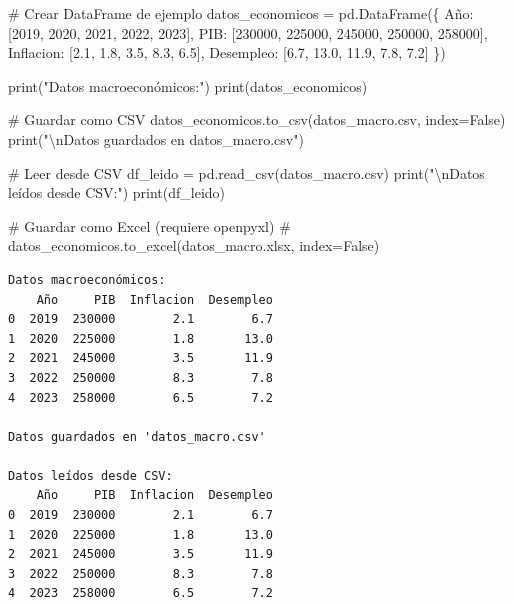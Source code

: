\documentclass[
  doc,
  floatsintext,
  longtable,
  a4paper,
  nolmodern,
  notxfonts,
  notimes,
  12pt,
  colorlinks=true,linkcolor=blue,citecolor=blue,urlcolor=blue]{apa7}
\newenvironment{Shaded}{\begin{snugshade}}{\end{snugshade}}
\newcommand{\BuiltInTok}[1]{\textcolor[rgb]{0.00,0.23,0.31}{#1}}
\newcommand{\CharTok}[1]{\textcolor[rgb]{0.13,0.47,0.30}{#1}}
\newcommand{\CommentTok}[1]{\textcolor[rgb]{0.37,0.37,0.37}{#1}}
\newcommand{\DecValTok}[1]{\textcolor[rgb]{0.68,0.00,0.00}{#1}}
\newcommand{\FloatTok}[1]{\textcolor[rgb]{0.68,0.00,0.00}{#1}}
\newcommand{\NormalTok}[1]{\textcolor[rgb]{0.00,0.23,0.31}{#1}}
\newcommand{\OperatorTok}[1]{\textcolor[rgb]{0.37,0.37,0.37}{#1}}
\newcommand{\StringTok}[1]{\textcolor[rgb]{0.13,0.47,0.30}{#1}}
\newcommand{\VariableTok}[1]{\textcolor[rgb]{0.07,0.07,0.07}{#1}}
\begin{document}
\begin{Shaded}
\begin{Highlighting}[]
\CommentTok{\# Crear DataFrame de ejemplo}
\NormalTok{datos\_economicos }\OperatorTok{=}\NormalTok{ pd.DataFrame(\{}
    \StringTok{\textquotesingle{}Año\textquotesingle{}}\NormalTok{: [}\DecValTok{2019}\NormalTok{, }\DecValTok{2020}\NormalTok{, }\DecValTok{2021}\NormalTok{, }\DecValTok{2022}\NormalTok{, }\DecValTok{2023}\NormalTok{],}
    \StringTok{\textquotesingle{}PIB\textquotesingle{}}\NormalTok{: [}\DecValTok{230000}\NormalTok{, }\DecValTok{225000}\NormalTok{, }\DecValTok{245000}\NormalTok{, }\DecValTok{250000}\NormalTok{, }\DecValTok{258000}\NormalTok{],}
    \StringTok{\textquotesingle{}Inflacion\textquotesingle{}}\NormalTok{: [}\FloatTok{2.1}\NormalTok{, }\FloatTok{1.8}\NormalTok{, }\FloatTok{3.5}\NormalTok{, }\FloatTok{8.3}\NormalTok{, }\FloatTok{6.5}\NormalTok{],}
    \StringTok{\textquotesingle{}Desempleo\textquotesingle{}}\NormalTok{: [}\FloatTok{6.7}\NormalTok{, }\FloatTok{13.0}\NormalTok{, }\FloatTok{11.9}\NormalTok{, }\FloatTok{7.8}\NormalTok{, }\FloatTok{7.2}\NormalTok{]}
\NormalTok{\})}

\BuiltInTok{print}\NormalTok{(}\StringTok{"Datos macroeconómicos:"}\NormalTok{)}
\BuiltInTok{print}\NormalTok{(datos\_economicos)}

\CommentTok{\# Guardar como CSV}
\NormalTok{datos\_economicos.to\_csv(}\StringTok{\textquotesingle{}datos\_macro.csv\textquotesingle{}}\NormalTok{, index}\OperatorTok{=}\VariableTok{False}\NormalTok{)}
\BuiltInTok{print}\NormalTok{(}\StringTok{"}\CharTok{\textbackslash{}n}\StringTok{Datos guardados en \textquotesingle{}datos\_macro.csv\textquotesingle{}"}\NormalTok{)}

\CommentTok{\# Leer desde CSV}
\NormalTok{df\_leido }\OperatorTok{=}\NormalTok{ pd.read\_csv(}\StringTok{\textquotesingle{}datos\_macro.csv\textquotesingle{}}\NormalTok{)}
\BuiltInTok{print}\NormalTok{(}\StringTok{"}\CharTok{\textbackslash{}n}\StringTok{Datos leídos desde CSV:"}\NormalTok{)}
\BuiltInTok{print}\NormalTok{(df\_leido)}

\CommentTok{\# Guardar como Excel (requiere openpyxl)}
\CommentTok{\# datos\_economicos.to\_excel(\textquotesingle{}datos\_macro.xlsx\textquotesingle{}, index=False)}
\end{Highlighting}
\end{Shaded}

\begin{verbatim}
Datos macroeconómicos:
    Año     PIB  Inflacion  Desempleo
0  2019  230000        2.1        6.7
1  2020  225000        1.8       13.0
2  2021  245000        3.5       11.9
3  2022  250000        8.3        7.8
4  2023  258000        6.5        7.2

Datos guardados en 'datos_macro.csv'

Datos leídos desde CSV:
    Año     PIB  Inflacion  Desempleo
0  2019  230000        2.1        6.7
1  2020  225000        1.8       13.0
2  2021  245000        3.5       11.9
3  2022  250000        8.3        7.8
4  2023  258000        6.5        7.2
\end{verbatim}
\end{document}
